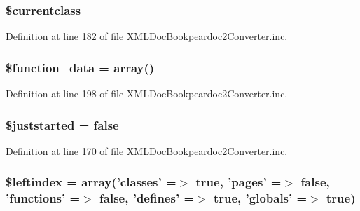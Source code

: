 \hypertarget{class_x_m_l_doc_bookpeardoc2_converter_a14f3ccc5fc24cdb94ee022a77ef69c4d}{
\subsubsection[{\$currentclass}]{\setlength{\rightskip}{0pt plus 5cm}\$currentclass}}\label{class_x_m_l_doc_bookpeardoc2_converter_a14f3ccc5fc24cdb94ee022a77ef69c4d}


\-Definition at line 182 of file \-X\-M\-L\-Doc\-Bookpeardoc2\-Converter.\-inc.

\hypertarget{class_x_m_l_doc_bookpeardoc2_converter_abbfa657ff6e0d3c42caa2576e218ebea}{
\subsubsection[{\$function\-\_\-data}]{\setlength{\rightskip}{0pt plus 5cm}\$function\-\_\-data = array()}}\label{class_x_m_l_doc_bookpeardoc2_converter_abbfa657ff6e0d3c42caa2576e218ebea}


\-Definition at line 198 of file \-X\-M\-L\-Doc\-Bookpeardoc2\-Converter.\-inc.

\hypertarget{class_x_m_l_doc_bookpeardoc2_converter_acb00e2d25525278b0592bfffe53bc4b6}{
\subsubsection[{\$juststarted}]{\setlength{\rightskip}{0pt plus 5cm}\$juststarted = false}}\label{class_x_m_l_doc_bookpeardoc2_converter_acb00e2d25525278b0592bfffe53bc4b6}


\-Definition at line 170 of file \-X\-M\-L\-Doc\-Bookpeardoc2\-Converter.\-inc.

\hypertarget{class_x_m_l_doc_bookpeardoc2_converter_ab49669c749559bb7833762878adb8f0c}{
\subsubsection[{\$leftindex}]{\setlength{\rightskip}{0pt plus 5cm}\$leftindex = array('classes' =$>$ true, 'pages' =$>$ false, 'functions' =$>$ false, 'defines' =$>$ true, 'globals' =$>$ true)}}\label{class_x_m_l_doc_bookpeardoc2_converter_ab49669c749559bb7833762878adb8f0c}


